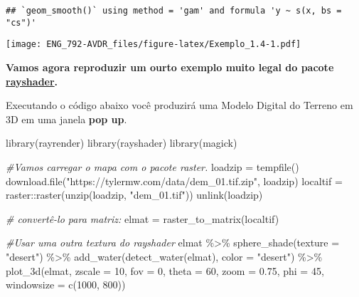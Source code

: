 \documentclass[
]{book}
\newenvironment{Shaded}{\begin{snugshade}}{\end{snugshade}}
\newcommand{\AttributeTok}[1]{\textcolor[rgb]{0.77,0.63,0.00}{#1}}
\newcommand{\CommentTok}[1]{\textcolor[rgb]{0.56,0.35,0.01}{\textit{#1}}}
\newcommand{\DecValTok}[1]{\textcolor[rgb]{0.00,0.00,0.81}{#1}}
\newcommand{\FloatTok}[1]{\textcolor[rgb]{0.00,0.00,0.81}{#1}}
\newcommand{\FunctionTok}[1]{\textcolor[rgb]{0.00,0.00,0.00}{#1}}
\newcommand{\NormalTok}[1]{#1}
\newcommand{\OtherTok}[1]{\textcolor[rgb]{0.56,0.35,0.01}{#1}}
\newcommand{\SpecialCharTok}[1]{\textcolor[rgb]{0.00,0.00,0.00}{#1}}
\newcommand{\StringTok}[1]{\textcolor[rgb]{0.31,0.60,0.02}{#1}}
\begin{document}
\begin{verbatim}
## `geom_smooth()` using method = 'gam' and formula 'y ~ s(x, bs = "cs")'
\end{verbatim}

\texttt{[image: ENG\_792-AVDR\_files/figure-latex/Exemplo\_1.4-1.pdf]}

\textbf{Vamos agora reproduzir um ourto exemplo muito legal do pacote \href{https://www.rayshader.com/}{rayshader}.}

Executando o código abaixo você produzirá uma Modelo Digital do Terreno em 3D em uma janela \textbf{pop up}.

\begin{Shaded}
\begin{Highlighting}[]
\FunctionTok{library}\NormalTok{(rayrender)}
\FunctionTok{library}\NormalTok{(rayshader)}
\FunctionTok{library}\NormalTok{(magick)}

\CommentTok{\#Vamos carregar o mapa com o pacote raster.}
\NormalTok{loadzip }\OtherTok{=} \FunctionTok{tempfile}\NormalTok{() }
\FunctionTok{download.file}\NormalTok{(}\StringTok{"https://tylermw.com/data/dem\_01.tif.zip"}\NormalTok{, loadzip)}
\NormalTok{localtif }\OtherTok{=}\NormalTok{ raster}\SpecialCharTok{::}\FunctionTok{raster}\NormalTok{(}\FunctionTok{unzip}\NormalTok{(loadzip, }\StringTok{"dem\_01.tif"}\NormalTok{))}
\FunctionTok{unlink}\NormalTok{(loadzip)}

\CommentTok{\# convertê{-}lo para matriz:}
\NormalTok{elmat }\OtherTok{=} \FunctionTok{raster\_to\_matrix}\NormalTok{(localtif)}

\CommentTok{\#Usar uma outra textura do rayshader}
\NormalTok{elmat }\SpecialCharTok{\%\textgreater{}\%}
  \FunctionTok{sphere\_shade}\NormalTok{(}\AttributeTok{texture =} \StringTok{"desert"}\NormalTok{) }\SpecialCharTok{\%\textgreater{}\%}
  \FunctionTok{add\_water}\NormalTok{(}\FunctionTok{detect\_water}\NormalTok{(elmat), }\AttributeTok{color =} \StringTok{"desert"}\NormalTok{) }\SpecialCharTok{\%\textgreater{}\%}
  \FunctionTok{plot\_3d}\NormalTok{(elmat, }\AttributeTok{zscale =} \DecValTok{10}\NormalTok{, }\AttributeTok{fov =} \DecValTok{0}\NormalTok{, }\AttributeTok{theta =} \DecValTok{60}\NormalTok{, }\AttributeTok{zoom =} \FloatTok{0.75}\NormalTok{, }\AttributeTok{phi =} \DecValTok{45}\NormalTok{, }\AttributeTok{windowsize =} \FunctionTok{c}\NormalTok{(}\DecValTok{1000}\NormalTok{, }\DecValTok{800}\NormalTok{))}
\end{Highlighting}
\end{Shaded}
\end{document}
